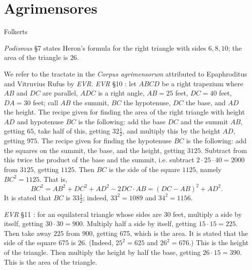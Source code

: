 \documentclass{amsart}
\theoremstyle{definition}
\begin{document}
\section{Agrimensores}
Folkerts \cite{folkerts}

{\em Podismus} \S 7 \cite[pp.~134--137]{guillaumin} states Heron's formula for the right triangle with sides
$6,8,10$; the area of the triangle is $26$.  

We refer to the tractate in the {\em Corpus agrimensorum} attributed to Epaphroditus and Vitruvius Rufus by {\em EVR}. {\em EVR}  
\S 10 \cite[pp.~140--141]{guillaumin}: let $ABCD$ be a right trapezium where $AB$ and $DC$ are parallel, $ADC$ is a right angle,
$AB=25$ feet, $DC=40$ feet, $DA=30$ feet; call $AB$ the summit, $BC$ the hypotenuse, $DC$ the base, and $AD$ the height.
The recipe given for finding the area
of the right triangle with height $AD$ and hypotenuse $BC$ is the following:
add the base $DC$ and the summit $AB$, getting $65$,  take half of this, getting $32 \frac{1}{2}$, and multiply this
by the height $AD$, getting $975$. The recipe given for finding the
hypotenuse $BC$ is the following: add the 
squares on the summit, the base, and the height, getting $3125$. 
Subtract from this twice the product of the base and the summit, i.e. subtract $2 \cdot 25 \cdot 40 = 2000$ from $3125$, getting $1125$. Then $BC$ is the side
of the square $1125$, namely $BC^2=1125$. That is, 
\[
BC^2 = AB^2+DC^2+AD^2 - 2  DC \cdot AB = (DC-AB)^2 + AD^2.
\]
It is stated that $BC$ is $33 \frac{1}{2}$; indeed, $33^2=1089$ and $34^2=1156$.

{\em EVR} \S 11 \cite[pp.~140--143]{guillaumin}: for an equilateral triangle whose sides are $30$ feet,
multiply a side by itself, getting $30\cdot 30 = 900$. Multiply half a side by itself, getting $15\cdot 15 = 225$. Then take away $225$ from
$900$, getting $675$, which is the area. It is stated that the side of the square $675$ is $26$. (Indeed, $25^2=625$ and $26^2=676$.)
This is the height of the triangle.
Then multiply  the height by half the base, getting $26\cdot 15 = 390$. This is the area of the triangle.
\end{document}
